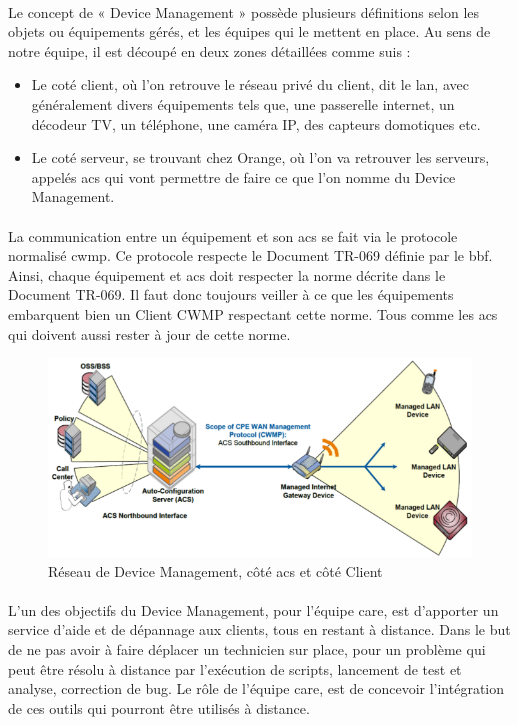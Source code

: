 \documentclass[12pt,a4paper]{report}
\begin{document}
\paragraph*{}
Le concept de « Device Management » possède plusieurs définitions selon les objets ou équipements gérés, et les équipes qui le mettent en place. Au sens de notre équipe, il est découpé en deux zones détaillées comme suis : 
\begin{itemize}
\subparagraph*{}
\item Le coté client, où l’on retrouve le réseau privé du client, dit le \gls{lan}, avec généralement divers équipements tels que, une passerelle internet, un décodeur TV, un téléphone, une caméra IP, des capteurs domotiques etc.
\item Le coté serveur, se trouvant chez Orange, où l’on va retrouver les serveurs, appelés \gls{acs} qui vont permettre de faire ce que l’on
nomme du Device Management.
\end{itemize}
\paragraph*{}
La communication entre un équipement et son \gls{acs} se fait via le protocole normalisé \gls{cwmp}. Ce protocole respecte le Document TR-069 définie par le \gls{bbf}. Ainsi, chaque équipement et \gls{acs} doit respecter la norme décrite dans le Document TR-069. Il faut donc toujours veiller à ce que les équipements embarquent bien un Client CWMP respectant cette norme. Tous comme les \gls{acs} qui doivent aussi rester à jour de cette norme.
\begin{figure}[!ht]
    \center
    \includegraphics[scale=0.7]{./img/DM-TR-069-screen.png}
    \caption{Réseau de Device Management, côté \gls{acs} et côté Client}
\end{figure}
\paragraph*{}
L’un des objectifs du Device Management, pour l’équipe \gls{care}, est d’apporter un service d’aide et de dépannage aux clients, tous en restant à distance. Dans le but de ne pas avoir à faire déplacer un technicien sur place, pour un problème qui peut être résolu à distance par l’exécution de scripts, lancement de test et analyse, correction de bug. Le rôle de l’équipe \gls{care}, est de concevoir l’intégration de ces outils qui pourront être utilisés à distance.
\end{document}
